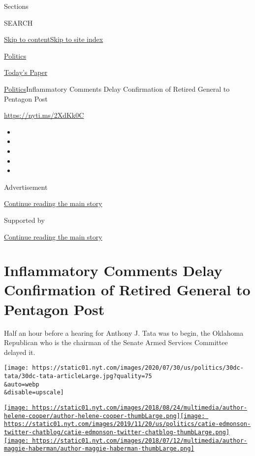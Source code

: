 Sections

SEARCH

\protect\hyperlink{site-content}{Skip to
content}\protect\hyperlink{site-index}{Skip to site index}

\href{https://www.nytimes.com/section/politics}{Politics}

\href{https://myaccount.nytimes.com/auth/login?response_type=cookie\&client_id=vi}{}

\href{https://www.nytimes.com/section/todayspaper}{Today's Paper}

\href{/section/politics}{Politics}\textbar{}Inflammatory Comments Delay
Confirmation of Retired General to Pentagon Post

\url{https://nyti.ms/2XdKk0C}

\begin{itemize}
\item
\item
\item
\item
\item
\end{itemize}

Advertisement

\protect\hyperlink{after-top}{Continue reading the main story}

Supported by

\protect\hyperlink{after-sponsor}{Continue reading the main story}

\hypertarget{inflammatory-comments-delay-confirmation-of-retired-general-to-pentagon-post}{%
\section{Inflammatory Comments Delay Confirmation of Retired General to
Pentagon
Post}\label{inflammatory-comments-delay-confirmation-of-retired-general-to-pentagon-post}}

Half an hour before a hearing for Anthony J. Tata was to begin, the
Oklahoma Republican who is the chairman of the Senate Armed Services
Committee delayed it.

\texttt{[image: https://static01.nyt.com/images/2020/07/30/us/politics/30dc-tata/30dc-tata-articleLarge.jpg?quality=75\\\&auto=webp\\\&disable=upscale]}

\href{https://www.nytimes.com/by/helene-cooper}{\texttt{[image: https://static01.nyt.com/images/2018/08/24/multimedia/author-helene-cooper/author-helene-cooper-thumbLarge.png]}}\href{https://www.nytimes.com/by/catie-edmondson}{\texttt{[image: https://static01.nyt.com/images/2019/11/20/us/politics/catie-edmonson-twitter-chatblog/catie-edmonson-twitter-chatblog-thumbLarge.png]}}\href{https://www.nytimes.com/by/maggie-haberman}{\texttt{[image: https://static01.nyt.com/images/2018/07/12/multimedia/author-maggie-haberman/author-maggie-haberman-thumbLarge.png]}}

